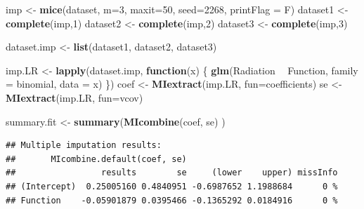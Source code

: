 \documentclass[
]{book}
\newenvironment{Shaded}{\begin{snugshade}}{\end{snugshade}}
\newcommand{\ControlFlowTok}[1]{\textcolor[rgb]{0.13,0.29,0.53}{\textbf{#1}}}
\newcommand{\DataTypeTok}[1]{\textcolor[rgb]{0.13,0.29,0.53}{#1}}
\newcommand{\DecValTok}[1]{\textcolor[rgb]{0.00,0.00,0.81}{#1}}
\newcommand{\KeywordTok}[1]{\textcolor[rgb]{0.13,0.29,0.53}{\textbf{#1}}}
\newcommand{\NormalTok}[1]{#1}
\newcommand{\OperatorTok}[1]{\textcolor[rgb]{0.81,0.36,0.00}{\textbf{#1}}}
\newcommand{\StringTok}[1]{\textcolor[rgb]{0.31,0.60,0.02}{#1}}
\begin{document}
\begin{Shaded}
\begin{Highlighting}[]
\NormalTok{imp <-}\StringTok{ }\KeywordTok{mice}\NormalTok{(dataset, }\DataTypeTok{m=}\DecValTok{3}\NormalTok{, }\DataTypeTok{maxit=}\DecValTok{50}\NormalTok{, }\DataTypeTok{seed=}\DecValTok{2268}\NormalTok{, }\DataTypeTok{printFlag =}\NormalTok{ F)}
\NormalTok{dataset1 <-}\StringTok{ }\KeywordTok{complete}\NormalTok{(imp,}\DecValTok{1}\NormalTok{)}
\NormalTok{dataset2 <-}\StringTok{ }\KeywordTok{complete}\NormalTok{(imp,}\DecValTok{2}\NormalTok{)}
\NormalTok{dataset3 <-}\StringTok{ }\KeywordTok{complete}\NormalTok{(imp,}\DecValTok{3}\NormalTok{)}
 
\NormalTok{dataset.imp <-}\StringTok{ }\KeywordTok{list}\NormalTok{(dataset1, dataset2, dataset3)}
 
\NormalTok{imp.LR <-}\StringTok{ }\KeywordTok{lapply}\NormalTok{(dataset.imp, }\ControlFlowTok{function}\NormalTok{(x) \{}
   \KeywordTok{glm}\NormalTok{(Radiation }\OperatorTok{~}\StringTok{ }\NormalTok{Function, }\DataTypeTok{family =}\NormalTok{ binomial, }\DataTypeTok{data =}\NormalTok{ x)}
\NormalTok{  \})}
\NormalTok{coef <-}\StringTok{ }\KeywordTok{MIextract}\NormalTok{(imp.LR, }\DataTypeTok{fun=}\NormalTok{coefficients) }
\NormalTok{se <-}\StringTok{ }\KeywordTok{MIextract}\NormalTok{(imp.LR, }\DataTypeTok{fun=}\NormalTok{vcov) }
 
\NormalTok{summary.fit <-}\StringTok{ }\KeywordTok{summary}\NormalTok{(}\KeywordTok{MIcombine}\NormalTok{(coef, se) )}
\end{Highlighting}
\end{Shaded}

\begin{verbatim}
## Multiple imputation results:
##       MIcombine.default(coef, se)
##                 results        se     (lower    upper) missInfo
## (Intercept)  0.25005160 0.4840951 -0.6987652 1.1988684      0 %
## Function    -0.05901879 0.0395466 -0.1365292 0.0184916      0 %
\end{verbatim}

\begin{Shaded}
\end{Shaded}
\end{document}
